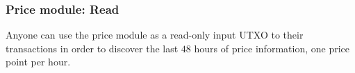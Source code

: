 \documentclass{article} %
\begin{document}
\subsubsection{Price module: Read}

Anyone can use the price module as a read-only input UTXO to their transactions
in order to discover the last $48$ hours of price information, one price point
per hour.

% 
% 
% 
% 
% 
\end{document}
